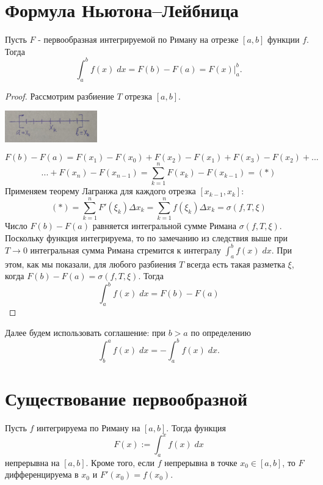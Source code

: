     \section{Формула Ньютона–Лейбница}
    
    \begin{theorem}
    	Пусть $F$ - первообразная интегрируемой по Риману на отрезке
    	$[a, b]$ функции $f$. Тогда
    	\[ \int_{a}^{b} f(x) \; dx = F(b) - F(a) = F(x)\bigg|_{a}^{b}. \]
    \end{theorem}
    
    \begin{proof}
    	Рассмотрим разбиение $T$ отрезка $[a, b]$.
    	\begin{center}
    		\includegraphics[width=0.3\textwidth]{img/lecture28/Newton_Leibniz_theorem}
    	\end{center}
    	\[ F(b) - F(a) = F(x_1) - F(x_0) + F(x_2) - F(x_1) + F(x_3) - F(x_2) + ... \]
    	\[ ... + F(x_n) - F(x_{n - 1}) = \sum_{k = 1}^n F(x_k) - F(x_{k - 1}) = (*) \]
    	Применяем теорему Лагранжа для каждого отрезка $[x_{k - 1}, x_k]$:
    	\[ (*) = \sum_{k = 1}^n F'(\xi_k) \Delta x_k = \sum_{k = 1}^n f(\xi_k) \Delta x_k = \sigma(f, T, \xi) \]
    	Число $F(b) - F(a)$ равняется интегральной сумме Римана $\sigma(f, T, \xi)$. Поскольку функция интегрируема, то по замечанию из следствия выше при $T \to 0$ интегральная сумма Римана стремится к интегралу $\int_{a}^{b} f(x) \; dx$. При этом, как мы показали, для любого разбиения $T$ всегда есть такая разметка $\xi$, когда $F(b) - F(a) = \sigma(f, T, \xi)$. Тогда
    	\[ \int_{a}^{b} f(x) \; dx = F(b) - F(a) \]
    \end{proof}
    
    Далее будем использовать соглашение: при $b > a$ по
    определению 
    \[ \displaystyle\int_{b}^{a} f(x) \; dx = -\displaystyle\int_{a}^{b} f(x) \; dx.\]
    
    \section{Существование первообразной}
    
    \begin{theorem}
    	Пусть $f$ интегрируема по Риману на $[a, b]$. Тогда функция
    	\[ F(x) := \int_a^{x} f(x) \; dx \]
    	непрерывна на $[a, b]$. Кроме того, если $f$ непрерывна в точке
    	$x_0 \in [a, b]$, то $F$ дифференцируема в $x_0$ и $F'(x_0) = f(x_0)$.
    \end{theorem}
    
